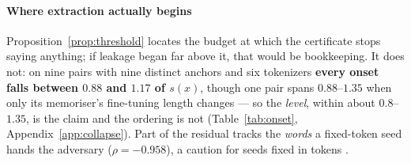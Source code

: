 
\paragraph{Where extraction actually begins}\label{sec:onset}

Proposition~\ref{prop:threshold} locates the budget at which the certificate stops saying anything;
if leakage began far above it, that would be bookkeeping. It does not: on nine pairs with nine
distinct anchors and six tokenizers \textbf{every onset falls between $0.88$ and $1.17$ of $s(x)$},
though one pair spans $0.88$--$1.35$ when only its memoriser's fine-tuning length changes --- so the
\emph{level}, within about $0.8$--$1.35$, is the claim and the ordering is not (Table~\ref{tab:onset},
Appendix~\ref{app:collapse}). Part of the residual tracks the \emph{words} a fixed-token seed hands
the adversary ($\rho = -0.958$), a caution for seeds fixed in tokens \citep{carlini2023quantifying}.
